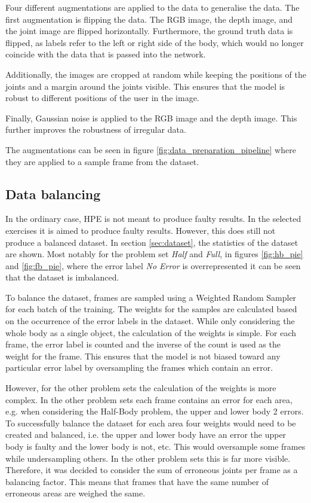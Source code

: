 Four different augmentations are applied to the data to generalise the data. The first augmentation is flipping the data. The RGB image, the depth image, and the joint image are flipped horizontally. Furthermore, the ground truth data is flipped, as labels refer to the left or right side of the body, which would no longer coincide with the data that is passed into the network.

Additionally, the images are cropped at random while keeping the positions of the joints and a margin around the joints visible. This ensures that the model is robust to different positions of the user in the image. 

Finally, Gaussian noise is applied to the RGB image and the depth image. This further improves the robustness of irregular data.

The augmentations can be seen in figure \ref{fig:data_preparation_pipeline} where they are applied to a sample frame from the dataset.

\subsection{Data balancing}

In the ordinary case, HPE is not meant to produce faulty results. In the selected exercises it is aimed to produce faulty results. However, this does still not produce a balanced dataset. In section \ref{sec:dataset}, the statistics of the dataset are shown. Most notably for the problem set \textit{Half} and \textit{Full}, in figures \ref{fig:hb_pie} and \ref{fig:fb_pie}, where the error label \textit{No Error} is overrepresented it can be seen that the dataset is imbalanced.

To balance the dataset, frames are sampled using a Weighted Random Sampler for each batch of the training. The weights for the samples are calculated based on the occurrence of the error labels in the dataset. While only considering the whole body as a single object, the calculation of the weights is simple. For each frame, the error label is counted and the inverse of the count is used as the weight for the frame. This ensures that the model is not biased toward any particular error label by oversampling the frames which contain an error.

However, for the other problem sets the calculation of the weights is more complex. In the other problem sets each frame contains an error for each area, e.g. when considering the Half-Body problem, the upper and lower body 2 errors. To successfully balance the dataset for each area four weights would need to be created and balanced, i.e. the upper and lower body have an error the upper body is faulty and the lower body is not, etc. This would oversample some frames while undersampling others. In the other problem sets this is far more visible. Therefore, it was decided to consider the sum of erroneous joints per frame as a balancing factor. This means that frames that have the same number of erroneous areas are weighed the same.
